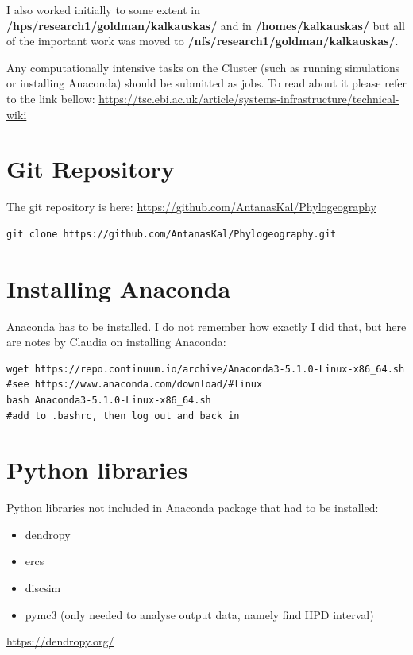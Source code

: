 I also worked initially to some extent in \textbf{/hps/research1/goldman/kalkauskas/} and in \textbf{/homes/kalkauskas/} but all of the important work was moved to \textbf{/nfs/research1/goldman/kalkauskas/}.

Any computationally intensive tasks on the Cluster (such as running simulations or installing Anaconda) should be submitted as jobs. To read about it please refer to the link bellow:
\url{https://tsc.ebi.ac.uk/article/systems-infrastructure/technical-wiki}
\section*{Git Repository}

The git repository is here: \url{https://github.com/AntanasKal/Phylogeography}

\begin{verbatim}
git clone https://github.com/AntanasKal/Phylogeography.git
\end{verbatim}

\section*{Installing Anaconda}

Anaconda has to be installed. I do not remember how exactly I did that, but here are notes by Claudia on installing Anaconda:

\begin{verbatim}
wget https://repo.continuum.io/archive/Anaconda3-5.1.0-Linux-x86_64.sh
#see https://www.anaconda.com/download/#linux
bash Anaconda3-5.1.0-Linux-x86_64.sh
#add to .bashrc, then log out and back in
\end{verbatim}

\section*{Python libraries}

Python libraries not included in Anaconda package that had to be installed:

\begin{itemize}
\item dendropy
\item ercs
\item discsim
\item pymc3 (only needed to analyse output data, namely find HPD interval)
\end{itemize}

\url{https://dendropy.org/}

